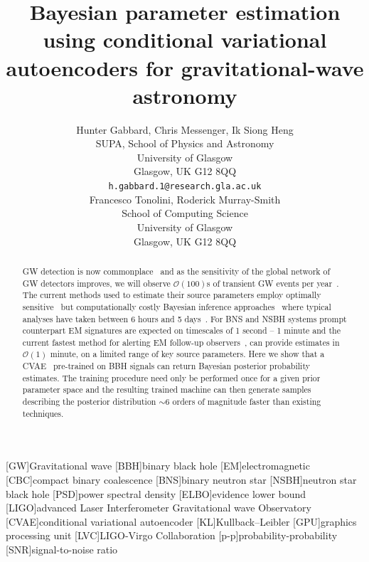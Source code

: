 \documentclass{article}
\title{Bayesian parameter estimation using conditional variational autoencoders
for gravitational-wave astronomy}
\author{
  Hunter Gabbard, Chris Messenger, Ik Siong Heng\\
  SUPA, School of Physics and Astronomy\\
  University of Glasgow\\
  Glasgow, UK G12 8QQ \\
  \texttt{h.gabbard.1@research.gla.ac.uk} \\
   \And
   Francesco Tonolini, Roderick Murray-Smith \\
   School of Computing Science \\
   University of Glasgow \\
   Glasgow, UK G12 8QQ \\
}
\begin{document}
\maketitle

[GW]{Gravitational wave}
[BBH]{binary black hole}
[EM]{electromagnetic}
[CBC]{compact binary coalescence}
[BNS]{binary neutron star}
[NSBH]{neutron star black hole}
[PSD]{power spectral density}
[ELBO]{evidence lower bound}
[LIGO]{advanced Laser Interferometer Gravitational wave Observatory}
[CVAE]{conditional variational autoencoder}
[KL]{Kullback--Leibler}
[GPU]{graphics processing unit}
[LVC]{LIGO-Virgo Collaboration}
[p-p]{probability-probability}
[SNR]{signal-to-noise ratio}

\begin{abstract}
  \ac{GW} detection is now
commonplace~\cite{PhysRevX.6.041015,PhysRevLett.119.161101} and as the
sensitivity of the global network of \ac{GW} detectors improves, we will
observe $\mathcal{O}(100)$s of transient \ac{GW} events per
year~\cite{2018LRR....21....3A}. The current methods used to estimate their
source parameters employ optimally sensitive~\cite{2009CQGra..26o5017S} but
computationally costly Bayesian inference approaches~\cite{1409.7215} where
typical analyses have taken between 6 hours and 5 days~\cite{gracedb_O3}.
%
%
For \ac{BNS} and \ac{NSBH} systems prompt counterpart \ac{EM} signatures are
expected on timescales of 1 second -- 1 minute and the current fastest method
for alerting \ac{EM} follow-up observers~\cite{2016PhRvD..93b4013S}, can
provide estimates in $\mathcal{O}(1)$ minute, on a limited range of key source
parameters. 
%
%
Here we show that a \ac{CVAE}~\cite{1904.06264,1812.04405} pre-trained on
\ac{BBH} signals can return Bayesian posterior probability estimates. The
training procedure need only be performed once for a given prior parameter
space and the resulting trained machine can then generate samples describing
the posterior distribution $\sim 6$ orders of magnitude faster than existing
techniques.
\end{abstract}
\end{document}
